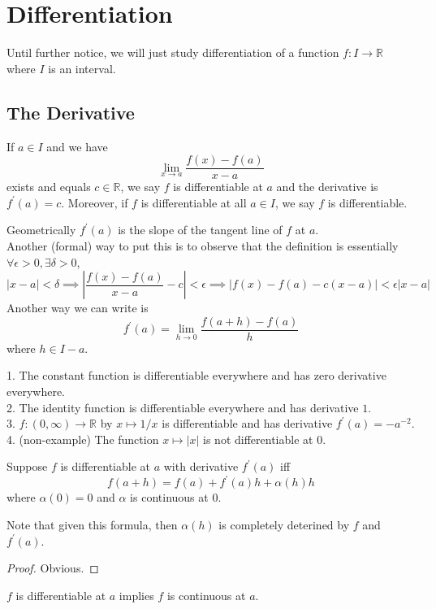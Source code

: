 \section{Differentiation}
Until further notice, we will just study differentiation of a function $f:I\to\mathbb R$ where $I$ is an interval.
\subsection{The Derivative}
\begin{definition}
    If $a\in I$ and we have
    $$\lim_{x\to a}\frac{f(x)-f(a)}{x-a}$$
    exists and equals $c\in\mathbb R$, we say $f$ is differentiable at $a$ and the derivative is $f^\prime(a)=c$.
    Moreover, if $f$ is differentiable at all $a\in I$, we say $f$ is differentiable.
\end{definition}
Geometrically $f^\prime(a)$ is the slope of the tangent line of $f$ at $a$.\\
Another (formal) way to put this is to observe that the definition is essentially $\forall \epsilon>0,\exists\delta>0$,
$$|x-a|<\delta\implies\left|\frac{f(x)-f(a)}{x-a}-c\right|<\epsilon\implies |f(x)-f(a)-c(x-a)|<\epsilon|x-a|$$
Another way we can write is
$$f^\prime(a)=\lim_{h\to 0}\frac{f(a+h)-f(a)}{h}$$
where $h\in I-a$.
\begin{example}
    1. The constant function is differentiable everywhere and has zero derivative everywhere.\\
    2. The identity function is differentiable everywhere and has derivative $1$.\\
    3. $f:(0,\infty)\to\mathbb R$ by $x\mapsto 1/x$ is differentiable and has derivative $f^\prime(a)=-a^{-2}$.\\
    4. (non-example) The function $x\mapsto |x|$ is not differentiable at $0$.
\end{example}
\begin{lemma}
    Suppose $f$ is differentiable at $a$ with derivative $f^\prime(a)$ iff
    $$f(a+h)=f(a)+f^\prime(a)h+\alpha(h)h$$
    where $\alpha(0)=0$ and $\alpha$ is continuous at $0$.
\end{lemma}
Note that given this formula, then $\alpha(h)$ is completely deterined by $f$ and $f^\prime(a)$.
\begin{proof}
    Obvious.
\end{proof}
\begin{corollary}
    $f$ is differentiable at $a$ implies $f$ is continuous at $a$.
\end{corollary}
